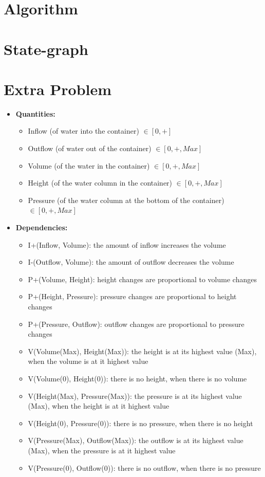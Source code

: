 \documentclass[a4paper]{article}
\begin{document}
\section{Algorithm}

\begin{algorithm}
\caption{}
\end{algorithm}

\section{State-graph}

\section{Extra Problem}

\begin{itemize}
\item \textbf{Quantities:}
\begin{itemize}
\item Inflow (of water into the container) $\in [0, +]$
\item Outflow (of water out of the container) $\in [0, +, Max]$
\item Volume (of the water in the container) $\in [0, +, Max]$
\item Height (of the water column in the container) $\in [0, +, Max]$
\item Pressure (of the water column at the bottom of the container) $\in [0, +, Max]$
\end{itemize}

\item \textbf{Dependencies:}

\begin{itemize}
\item I+(Inflow, Volume): the amount of inflow increases the volume
\item I-(Outflow, Volume): the amount of outflow decreases the volume
\item P+(Volume, Height): height changes are proportional to volume changes
\item P+(Height, Pressure): pressure changes are proportional to height changes
\item P+(Pressure, Outflow): outflow changes are proportional to pressure changes
\item V(Volume(Max), Height(Max)): the height is at its highest value (Max), when the volume is at it highest value
\item V(Volume(0), Height(0)): there is no height, when there is no volume
\item V(Height(Max), Pressure(Max)): the pressure is at its highest value (Max), when the height is at it highest value
\item V(Height(0), Pressure(0)): there is no pressure, when there is no height
\item V(Pressure(Max), Outflow(Max)): the outflow is at its highest value (Max), when the pressure is at it highest value
\item V(Pressure(0), Outflow(0)): there is no outflow, when there is no pressure
\end{itemize}
\end{itemize}
\end{document}
